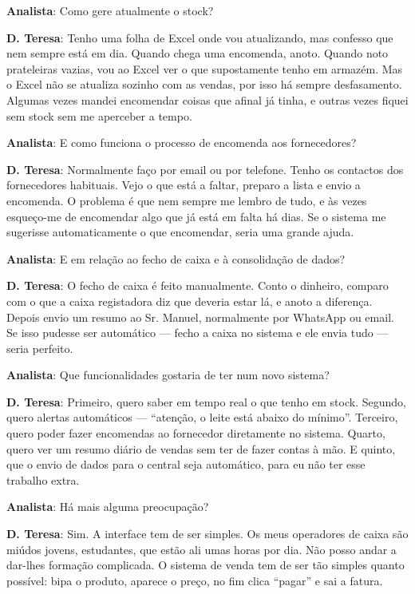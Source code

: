 \documentclass[a4paper,12pt]{scrreprt}
\begin{document}
\textbf{Analista}: Como gere atualmente o stock?

\textbf{D. Teresa}: Tenho uma folha de Excel onde vou atualizando, mas confesso que nem sempre está em dia. Quando chega uma encomenda, anoto. Quando noto prateleiras vazias, vou ao Excel ver o que supostamente tenho em armazém. Mas o Excel não se atualiza sozinho com as vendas, por isso há sempre desfasamento. Algumas vezes mandei encomendar coisas que afinal já tinha, e outras vezes fiquei sem stock sem me aperceber a tempo.

\textbf{Analista}: E como funciona o processo de encomenda aos fornecedores?

\textbf{D. Teresa}: Normalmente faço por email ou por telefone. Tenho os contactos dos fornecedores habituais. Vejo o que está a faltar, preparo a lista e envio a encomenda. O problema é que nem sempre me lembro de tudo, e às vezes esqueço-me de encomendar algo que já está em falta há dias. Se o sistema me sugerisse automaticamente o que encomendar, seria uma grande ajuda.

\textbf{Analista}: E em relação ao fecho de caixa e à consolidação de dados?

\textbf{D. Teresa}: O fecho de caixa é feito manualmente. Conto o dinheiro, comparo com o que a caixa registadora diz que deveria estar lá, e anoto a diferença. Depois envio um resumo ao Sr. Manuel, normalmente por WhatsApp ou email. Se isso pudesse ser automático --- fecho a caixa no sistema e ele envia tudo --- seria perfeito.

\textbf{Analista}: Que funcionalidades gostaria de ter num novo sistema?

\textbf{D. Teresa}: Primeiro, quero saber em tempo real o que tenho em stock. Segundo, quero alertas automáticos --- ``atenção, o leite está abaixo do mínimo''. Terceiro, quero poder fazer encomendas ao fornecedor diretamente no sistema. Quarto, quero ver um resumo diário de vendas sem ter de fazer contas à mão. E quinto, que o envio de dados para o central seja automático, para eu não ter esse trabalho extra.

\textbf{Analista}: Há mais alguma preocupação?

\textbf{D. Teresa}: Sim. A interface tem de ser simples. Os meus operadores de caixa são miúdos jovens, estudantes, que estão ali umas horas por dia. Não posso andar a dar-lhes formação complicada. O sistema de venda tem de ser tão simples quanto possível: bipa o produto, aparece o preço, no fim clica ``pagar'' e sai a fatura.
\end{document}
